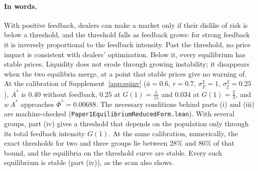 \documentclass[12pt]{article}
\theoremstyle{definition}
\theoremstyle{remark}
\begin{document}
\paragraph{In words.} With positive feedback, dealers can make a market only if their dislike of risk is below a threshold, and the threshold falls as feedback grows: for strong feedback it is inversely proportional to the feedback intensity. Past the threshold, no price impact is consistent with dealers' optimization. Below it, every equilibrium has stable prices. Liquidity does not erode through growing instability; it disappears when the two equilibria merge, at a point that stable prices give no warning of. At the calibration of Supplement~\ref{app:eqinv} ($\bar a=0.6$, $r=0.7$, $\sigma_F^2=1$, $\sigma_\xi^2=0.25$), $A^*$ is 0.40 without feedback, 0.25 at $G(1)=\tfrac1{15}$ and 0.034 at $G(1)=\tfrac23$, and $w\,A^*$ approaches $\Phi^*=0.00688$. The necessary conditions behind parts (i) and (iii) are machine-checked (\nolinkurl{Paper1EquilibriumReducedForm.lean}). With several groups, part (iv) gives a threshold that depends on the population only through its total feedback intensity $G(1)$. At the same calibration, numerically, the exact thresholds for two and three groups lie between 28\% and 86\% of that bound, and the equilibria on the threshold curve are stable. Every such equilibrium is stable (part (iv)), as the scan also shows.
\end{document}

